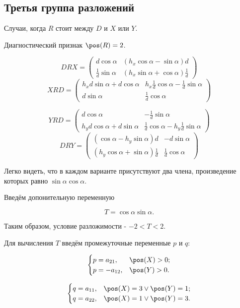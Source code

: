 \subsection{Третья группа разложений}

Случаи, когда $R$ стоит между $D$ и $X$ или $Y$.

Диагностический признак $\pos(R)=2$.

$$DRX = 
\begin{pmatrix}
	d\cos\alpha  & \left({h_x} \cos\alpha -\sin\alpha\right)  d\\
	\frac{1}{d} \sin\alpha  & \left({h_x} \sin\alpha +\cos\alpha\right)  \frac{1}{d}
\end{pmatrix}
$$
$$XRD = \begin{pmatrix}
	{h_x} d \sin\alpha + d \cos\alpha & {h_x} \frac{1}{d} \cos\alpha-\frac{1}{d} \sin\alpha\\
	d \sin\alpha & \frac{1}{d} \cos\alpha
\end{pmatrix}$$

$$YRD = \begin{pmatrix}
d \cos\alpha & -\frac{1}{d} \sin\alpha\\
{h_y} d \cos\alpha+d \sin\alpha & \frac{1}{d} \cos\alpha-{h_y} \frac{1}{d} \sin\alpha
\end{pmatrix}$$
$$DRY =
\begin{pmatrix}
\left( \cos\alpha-{h_y} \sin\alpha\right)  d & -d \sin\alpha\\
\left( {h_y} \cos\alpha+\sin\alpha\right)  \frac{1}{d} & \frac{1}{d} \cos\alpha
\end{pmatrix}
$$

Легко видеть, что в каждом варианте присутствуют два члена, произведение которых равно $\sin\alpha \cos\alpha$.

Введём допонительную переменную

$$T = \cos\alpha\sin\alpha.$$

Таким образом, условие разложимости - $-2<T<2$. 

Для вычисления $T$ введём промежуточные переменные $p$ и $q$:

$$\begin{cases}
	p = a_{21}, & \pos(X)>0;\\
	p = -a_{12}, & \pos(Y)>0.
\end{cases}$$

$$\begin{cases}
	q = a_{11}, & \pos(X)=3 \vee \pos(Y)=1;\\
	q = a_{22}, & \pos(X)=1 \vee \pos(Y)=3.
\end{cases}$$

